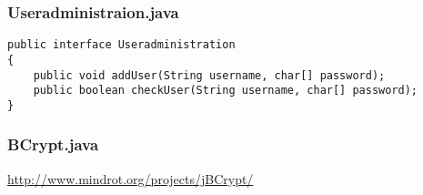 \documentclass[10pt,a4paper]{article}
\begin{document}
\subsubsection*{Useradministraion.java}
\begin{verbatim}
public interface Useradministration
{
    public void addUser(String username, char[] password);
    public boolean checkUser(String username, char[] password);
}
\end{verbatim}

\subsubsection*{BCrypt.java}
\url{http://www.mindrot.org/projects/jBCrypt/}
\end{document}
